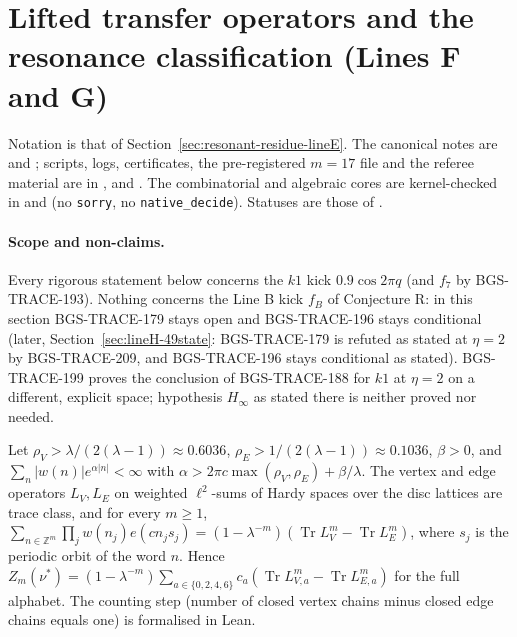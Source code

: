 \section{Lifted transfer operators and the resonance classification (Lines F and G)}
\label{sec:lifted-transfer-lineFG}
Notation is that of Section~\ref{sec:resonant-residue-lineE}. The canonical notes are  and
; scripts, logs, certificates, the pre-registered \(m=17\) file and the referee material are in
,  and . The combinatorial and algebraic cores are
kernel-checked in  and  (no \texttt{sorry}, no \texttt{native\_decide}). Statuses are those of .

\paragraph{Scope and non-claims.} Every rigorous statement below concerns the \(k1\) kick \(0.9\cos2\pi q\) (and \(f_7\) by BGS-TRACE-193). Nothing concerns the Line B kick \(f_B\) of Conjecture R: in this section BGS-TRACE-179 stays open and BGS-TRACE-196 stays conditional (later, Section~\ref{sec:lineH-49state}: BGS-TRACE-179 is refuted as stated at \(\eta=2\) by BGS-TRACE-209, and BGS-TRACE-196 stays conditional as stated). BGS-TRACE-199 proves the conclusion of BGS-TRACE-188 for \(k1\) at \(\eta=2\) on a different, explicit space; hypothesis \(H_\infty\) as stated there is neither proved nor needed.

\begin{theorem}
Let \(\rho_V>\lambda/(2(\lambda-1))\approx0.6036\), \(\rho_E>1/(2(\lambda-1))\approx0.1036\), \(\beta>0\), and \(\sum_n\lvert w(n)\rvert e^{\alpha\lvert n\rvert}<\infty\) with \(\alpha>2\pi c\max(\rho_V,\rho_E)+\beta/\lambda\). The vertex and edge operators \(L_V,L_E\) on weighted \(\ell^2\)-sums of Hardy spaces over the disc lattices are trace class, and for every \(m\ge1\), \(\sum_{n\in\mathbb Z^m}\prod_jw(n_j)e(cn_js_j)=(1-\lambda^{-m})(\operatorname{Tr}L_V^m-\operatorname{Tr}L_E^m)\), where \(s_j\) is the periodic orbit of the word \(n\). Hence \(Z_m(\nu^*)=(1-\lambda^{-m})\sum_{a\in\{0,2,4,6\}}c_a(\operatorname{Tr}L_{V,a}^m-\operatorname{Tr}L_{E,a}^m)\) for the full alphabet. The counting step (number of closed vertex chains minus closed edge chains equals one) is formalised in Lean.
\end{theorem}

